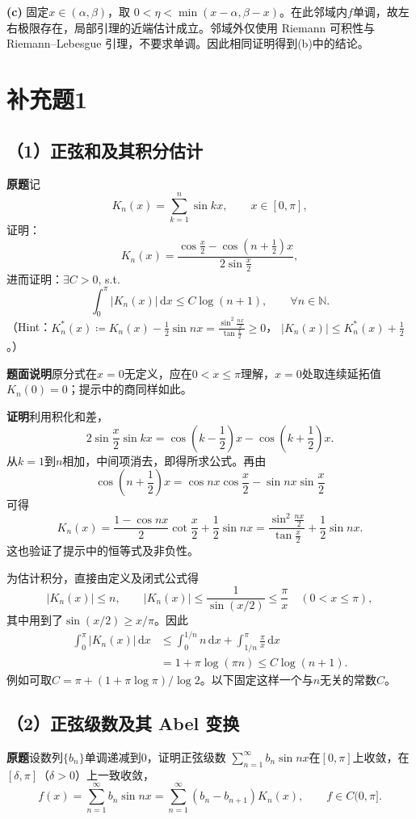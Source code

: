 \documentclass[11pt,a4paper]{ctexart}
\newcommand{\N}{\mathbb N}
\newcommand{\dd}{\,\mathrm d}
\newcommand{\proofstart}{\par\noindent\textbf{证明}\quad}
\begin{document}
\textbf{(c)} 固定$x\in(\alpha,\beta)$，取
$0<\eta<\min(x-\alpha,\beta-x)$。在此邻域内$f$单调，故左右极限存在，局部引理的近端估计成立。邻域外仅使用 Riemann 可积性与 Riemann--Lebesgue 引理，不要求单调。因此相同证明得到(b)中的结论。

\clearpage
\section{补充题1}
\subsection*{（1）正弦和及其积分估计}
\noindent\textbf{原题}\quad 记
\[
 K_n(x)=\sum_{k=1}^n\sin kx,\qquad x\in[0,\pi],
\]
证明：
\[
 K_n(x)=\frac{\cos\frac x2-\cos(n+\frac12)x}{2\sin\frac x2},
\]
进而证明：$\exists C>0$, s.t.
\[
 \int_0^\pi |K_n(x)|\dd x\le C\log(n+1),\qquad \forall n\in\N.
\]
（Hint：$K_n^*(x)\coloneqq K_n(x)-\frac12\sin nx
=\frac{\sin^2\frac{nx}{2}}{\tan\frac x2}\ge0$，
$|K_n(x)|\le K_n^*(x)+\frac12$。）

\noindent\textbf{题面说明}\quad 原分式在$x=0$无定义，应在$0<x\le\pi$理解，$x=0$处取连续延拓值$K_n(0)=0$；提示中的商同样如此。

\proofstart 利用积化和差，
\[
 2\sin\frac x2\sin kx
 =\cos\left(k-\frac12\right)x-\cos\left(k+\frac12\right)x.
\]
从$k=1$到$n$相加，中间项消去，即得所求公式。再由
\[
 \cos\left(n+\frac12\right)x
 =\cos nx\cos\frac x2-\sin nx\sin\frac x2
\]
可得
\[
 K_n(x)=\frac{1-\cos nx}{2}\cot\frac x2+\frac12\sin nx
 =\frac{\sin^2\frac{nx}{2}}{\tan\frac x2}+\frac12\sin nx.
\]
这也验证了提示中的恒等式及非负性。

为估计积分，直接由定义及闭式公式得
\[
 |K_n(x)|\le n,\qquad
 |K_n(x)|\le\frac1{\sin(x/2)}\le\frac\pi x
 \quad(0<x\le\pi),
\]
其中用到了$\sin(x/2)\ge x/\pi$。因此
\begin{align*}
 \int_0^\pi|K_n(x)|\dd x
 &\le\int_0^{1/n}n\dd x+\int_{1/n}^\pi\frac\pi x\dd x\\
 &=1+\pi\log(\pi n)\le C\log(n+1).
\end{align*}
例如可取$C=\pi+(1+\pi\log\pi)/\log2$。以下固定这样一个与$n$无关的常数$C$。

\subsection*{（2）正弦级数及其 Abel 变换}
\noindent\textbf{原题}\quad 设数列$\{b_n\}$单调递减到$0$，证明正弦级数
$\sum_{n=1}^{\infty}b_n\sin nx$在$[0,\pi]$上收敛，在$[\delta,\pi]$（$\delta>0$）上一致收敛，
\[
 f(x)=\sum_{n=1}^{\infty}b_n\sin nx
 =\sum_{n=1}^{\infty}(b_n-b_{n+1})K_n(x),
 \qquad f\in C(0,\pi].
\]
\end{document}

